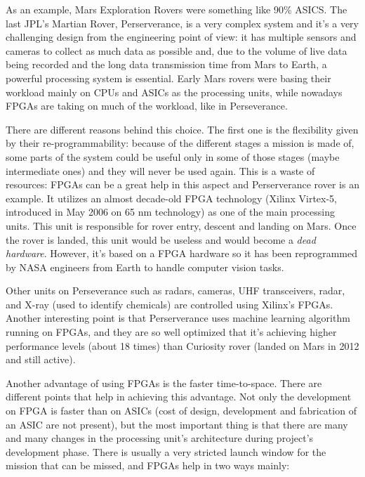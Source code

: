 As an example, Mars Exploration Rovers were something like 90\% ASICS. The last JPL's Martian Rover, Perserverance, is a very complex system and it's a very challenging design from the engineering point of view: it has multiple sensors and cameras to collect as much data as possible and, due to the volume of live data being recorded and the long data transmission time from Mars to Earth, a powerful processing system is essential. Early Mars rovers were basing their workload mainly on CPUs and ASICs as the processing units, while nowadays FPGAs are taking on much of the workload, like in Perseverance.\bigskip

There are different reasons behind this choice. The first one is the flexibility given by their re-programmability: because of the different stages a mission is made of, some parts of the system could be useful only in some of those stages (maybe intermediate ones) and they will never be used again. This is a waste of resources: FPGAs can be a great help in this aspect and Perserverance rover is an example. It utilizes an almost decade-old FPGA technology (Xilinx Virtex-5, introduced in May 2006 on 65 nm technology) as one of the main processing units. This unit is responsible for rover entry, descent and landing on Mars. Once the rover is landed, this unit would be useless and would become a \textit{dead hardware}. However, it's based on a FPGA hardware so it has been reprogrammed by NASA engineers from Earth to handle computer vision tasks.\bigskip

Other units on Perseverance such as radars, cameras, UHF transceivers, radar, and X-ray (used to identify chemicals) are controlled using Xilinx's FPGAs. Another interesting point is that Perserverance uses machine learning algorithm running on FPGAs, and they are so well optimized that it's achieving higher performance levels (about 18 times) than Curiosity rover (landed on Mars in 2012 and still active). \bigskip

Another advantage of using FPGAs is the faster time-to-space. There are different points that help in achieving this advantage. Not only the development on FPGA is faster than on ASICs (cost of design, development and fabrication of an ASIC are not present), but the most important thing is that there are many and many changes in the processing unit's architecture during project's development phase. There is usually a very stricted launch window for the mission that can be missed, and FPGAs help in two ways mainly:


